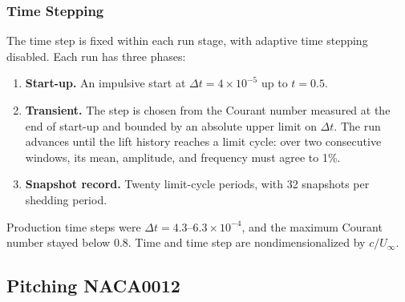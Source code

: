 \subsubsection{Time Stepping}
The time step is fixed within each run stage, with adaptive time stepping disabled. Each run has three phases:
\begin{enumerate}
\item \textbf{Start-up.} An impulsive start at $\Delta t=4\times10^{-5}$ up to $t=0.5$.
\item \textbf{Transient.} The step is chosen from the Courant number measured at the end of start-up and bounded by an absolute upper limit on $\Delta t$. The run advances until the lift history reaches a limit cycle: over two consecutive windows, its mean, amplitude, and frequency must agree to 1\%.
\item \textbf{Snapshot record.} Twenty limit-cycle periods, with 32 snapshots per shedding period.
\end{enumerate}
Production time steps were $\Delta t=4.3$--$6.3\times10^{-4}$, and the maximum Courant number stayed below 0.8. Time and time step are nondimensionalized by $c/U_\infty$.

\FloatBarrier
\subsection{Pitching NACA0012}
